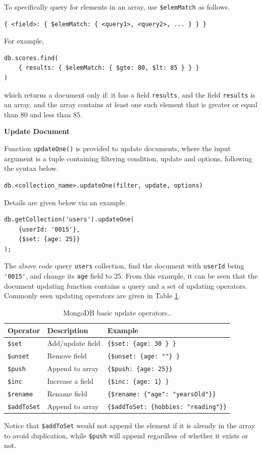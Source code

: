To specifically query for elements in an array, use \verb|$elemMatch| as follows.
\begin{lstlisting}
{ <field>: { $elemMatch: { <query1>, <query2>, ... } } }
\end{lstlisting}
For example,
\begin{lstlisting}
db.scores.find(
	{ results: { $elemMatch: { $gte: 80, $lt: 85 } } }
)
\end{lstlisting}
which returns a document only if: it has a field \verb|results|, and the field \verb|results| is an array, and the array contains at least one such element that is greater or equal than $80$ and less than $85$.

\vspace{0.1in}
\noindent \textbf{Update Document}
\vspace{0.1in}

Function \verb|updateOne()| is provided to update documents, where the input argument is a tuple containing filtering condition, update and options, following the syntax below.
\begin{lstlisting}
db.<collection_name>.updateOne(filter, update, options)
\end{lstlisting}
Details are given below via an example.
\begin{lstlisting}
db.getCollection('users').updateOne(
	{userId: '0015'},
	{$set: {age: 25}}
);
\end{lstlisting}
The above code query \verb|users| collection, find the document with \verb|userId| being \verb|'0015'|, and change its \verb|age| field to $25$. From this example, it can be seen that the document updating function contains a query and a set of updating operators. Commonly seen updating operators are given in Table \ref{ch:db:tab:mongodbupdateoperator}.

\begin{table}
	\centering \caption{MongoDB basic update operators..}\label{ch:db:tab:mongodbupdateoperator}
	\begin{tabularx}{\textwidth}{llX}
		\hline
		Operator & Description & Example \\ \hline
		\verb|$set| & Add/update field & \verb|{$set: {age: 30 } }| \\ 
		\verb|$unset| & Remove field & \verb|{$unset: {age: ""} }| \\ 
		\verb|$push| & Append to array & \verb|{$push: {age: 25}}| \\ 
		\verb|$inc| & Increase a field & \verb|{$inc: {age: 1} }| \\ 
		\verb|$rename| & Rename field &  \verb|{$rename: {"age": "yearsOld"}}| \\ 
		\verb|$addToSet| & Append to array & \verb|{$addToSet: {hobbies: "reading"}}| \\
		\hline
	\end{tabularx}
	\begin{flushleft}
		\footnotesize
		Notice that \verb|$addToSet| would not append the element if it is already in the array to avoid duplication, while \verb|$push| will append regardless of whether it exists or not.  
	\end{flushleft}
\end{table}

